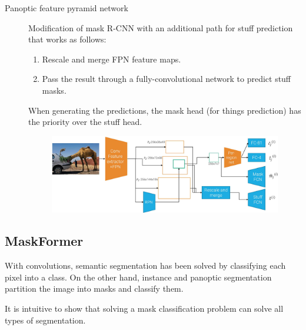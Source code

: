 \begin{description}
    \item[Panoptic feature pyramid network] 
        Modification of mask R-CNN with an additional path for stuff prediction that works as follows:
        \begin{enumerate}
            \item Rescale and merge FPN feature maps.
            \item Pass the result through a fully-convolutional network to predict stuff masks.
        \end{enumerate}

        When generating the predictions, the mask head (for things prediction) has the priority over the stuff head.

        \begin{figure}[H]
            \centering
            \includegraphics[width=0.85\linewidth]{./img/_panoptic_fpn.jpg}
        \end{figure}
\end{description}


\subsection{MaskFormer}

\begin{remark}
    With convolutions, semantic segmentation has been solved by classifying each pixel into a class. On the other hand, instance and panoptic segmentation partition the image into masks and classify them.

    It is intuitive to show that solving a mask classification problem can solve all types of segmentation.
\end{remark}

